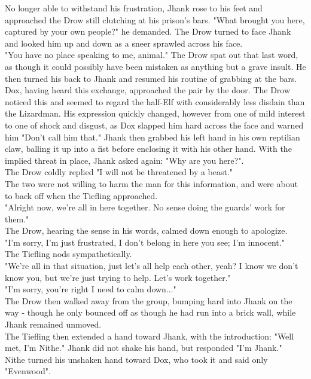\documentclass[letterpaper,10pt,twoside,twocolumn,openany]{book}
\begin{document}
No longer able to withstand his frustration, Jhank rose to his feet and approached the Drow still clutching at his prison's bars. "What brought you here, captured by your own people?" he demanded. The Drow turned to face Jhank and looked him up and down as a sneer sprawled across his face.\\


"You have no place speaking to me, animal." The Drow spat out that last word, as though it could possibly have been mistaken as anything but a grave insult. He then turned his back to Jhank and resumed his routine of grabbing at the bars.\\

Dox, having heard this exchange, approached the pair by the door. The Drow noticed this and seemed to regard the half-Elf with considerably less disdain than the Lizardman. His expression quickly changed, however from one of mild interest to one of shock and disgust, as Dox slapped him hard across the face and warned him "Don't call him that." Jhank then grabbed his left hand in his own reptilian claw, balling it up into a fist before enclosing it with his other hand. With the implied threat in place, Jhank asked again: "Why are you here?".\\

The Drow coldly replied "I will not be threatened by a beast."\\

The two were not willing to harm the man for this information, and were about to back off when the Tiefling approached.\\
"Alright now, we're all in here together. No sense doing the guards' work for them."\\
The Drow, hearing the sense in his words, calmed down enough to apologize.\\
"I'm sorry, I'm just frustrated, I don't belong in here you see; I'm innocent."\\
The Tiefling nods sympathetically.\\
"We're all in that situation, just let's all help each other, yeah? I know we don't know you, but we're just trying to help. Let's work together."\\
"I'm sorry, you're right I need to calm down..."\\
The Drow then walked away from the group, bumping hard into Jhank on the way - though he only bounced off as though he had run into a brick wall, while Jhank remained unmoved.\\
The Tiefling then extended a hand toward Jhank, with the introduction: "Well met, I'm Nithe." Jhank did not shake his hand, but responded "I'm Jhank."\\
Nithe turned his unshaken hand toward Dox, who took it and said only "Evenwood".\\
\end{document}
